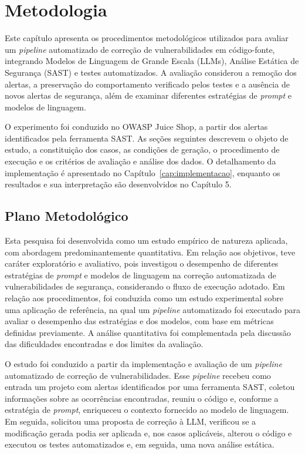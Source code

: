 \chapter[Metodologia]{Metodologia}
\label{cap:metodologia}

Este capítulo apresenta os procedimentos metodológicos utilizados para avaliar um \textit{pipeline} automatizado de correção de vulnerabilidades em código-fonte, integrando Modelos de Linguagem de Grande Escala (LLMs), Análise Estática de Segurança (SAST) e testes automatizados. A avaliação considerou a remoção dos alertas, a preservação do comportamento verificado pelos testes e a ausência de novos alertas de segurança, além de examinar diferentes estratégias de \textit{prompt} e modelos de linguagem.

O experimento foi conduzido no OWASP Juice Shop, a partir dos alertas identificados pela ferramenta SAST. As seções seguintes descrevem o objeto de estudo, a constituição dos casos, as condições de geração, o procedimento de execução e os critérios de avaliação e análise dos dados. O detalhamento da implementação é apresentado no Capítulo~\ref{cap:implementacao}, enquanto os resultados e sua interpretação são desenvolvidos no Capítulo 5.

\section{Plano Metodológico}
\label{sec:met-plano}

Esta pesquisa foi desenvolvida como um estudo empírico de natureza aplicada, com abordagem predominantemente quantitativa. Em relação aos objetivos, teve caráter exploratório e avaliativo, pois investigou o desempenho de diferentes estratégias de \textit{prompt} e modelos de linguagem na correção automatizada de vulnerabilidades de segurança, considerando o fluxo de execução adotado. Em relação aos procedimentos, foi conduzida como um estudo experimental sobre uma aplicação de referência, na qual um \textit{pipeline} automatizado foi executado para avaliar o desempenho das estratégias e dos modelos, com base em métricas definidas previamente. A análise quantitativa foi complementada pela discussão das dificuldades encontradas e dos limites da avaliação.

O estudo foi conduzido a partir da implementação e avaliação de um \textit{pipeline} automatizado de correção de vulnerabilidades. Esse \textit{pipeline} recebeu como entrada um projeto com alertas identificados por uma ferramenta SAST, coletou informações sobre as ocorrências encontradas, reuniu o código e, conforme a estratégia de \textit{prompt}, enriqueceu o contexto fornecido ao modelo de linguagem. Em seguida, solicitou uma proposta de correção à LLM, verificou se a modificação gerada podia ser aplicada e, nos casos aplicáveis, alterou o código e executou os testes automatizados e, em seguida, uma nova análise estática.

